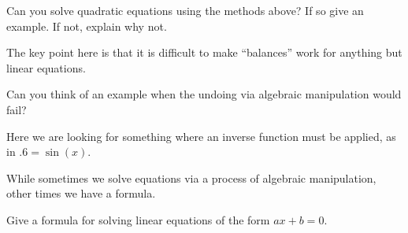 \begin{prob}
Can you solve quadratic equations using the methods above?
If so give an example. If not, explain why not.
\end{prob}

\begin{teachingnote}
The key point here is that it is difficult to make ``balances'' work
for anything but linear equations.
\end{teachingnote}



\begin{prob}
Can you think of an example when the undoing via algebraic
manipulation would fail?
\end{prob}

\begin{teachingnote}
Here we are looking for something where an inverse function must be
applied, as in $.6 = \sin(x)$.
\end{teachingnote}


While sometimes we solve equations via a process of algebraic
manipulation, other times we have a formula.


\begin{prob}
Give a formula for solving linear equations of the form $ax + b =0$.
\end{prob}


%
%
%


